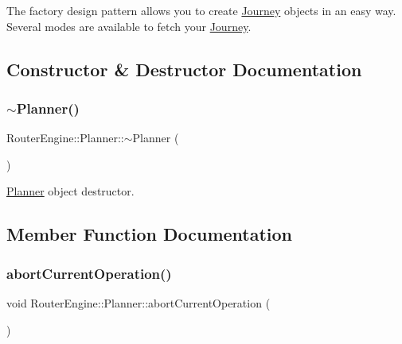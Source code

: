 The factory design pattern allows you to create \mbox{\hyperlink{classQRail_1_1RouterEngine_1_1Journey}{Journey}} objects in an easy way. Several modes are available to fetch your \mbox{\hyperlink{classQRail_1_1RouterEngine_1_1Journey}{Journey}}. 

\subsection{Constructor \& Destructor Documentation}
\mbox{\label{classQRail_1_1RouterEngine_1_1Planner_a3ef159b1f214b7e7f2aecb94d1a2bbed}} 
\subsubsection{\texorpdfstring{$\sim$Planner()}{~Planner()}}
{\footnotesize\ttfamily Router\+Engine\+::\+Planner\+::$\sim$\+Planner (\begin{DoxyParamCaption}{ }\end{DoxyParamCaption})}



\mbox{\hyperlink{classQRail_1_1RouterEngine_1_1Planner}{Planner}} object destructor. 



\subsection{Member Function Documentation}
\mbox{\label{classQRail_1_1RouterEngine_1_1Planner_a6098ae8b5db4f0c9cfe4352486ac4fc1}} 
\subsubsection{\texorpdfstring{abortCurrentOperation()}{abortCurrentOperation()}}
{\footnotesize\ttfamily void Router\+Engine\+::\+Planner\+::abort\+Current\+Operation (\begin{DoxyParamCaption}{ }\end{DoxyParamCaption})}



